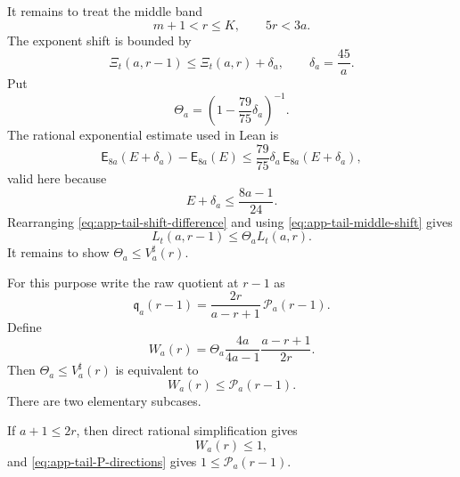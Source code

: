 \documentclass[11pt]{article}
\theoremstyle{definition}
\theoremstyle{remark}
\newcommand{\PE}{\mathsf E}
\begin{document}
It remains to treat the middle band
\begin{equation}\label{eq:app-tail-middle-upper}
 m+1<r\le K,
 \qquad 5r<3a.
\end{equation}
The exponent shift is bounded by
\begin{equation}\label{eq:app-tail-middle-shift}
 \Xi_t(a,r-1)\le \Xi_t(a,r)+\delta_a,
 \qquad \delta_a=\frac{45}{a}.
\end{equation}
Put
\begin{equation}\label{eq:app-tail-F}
 \Theta_a=\left(1-\frac{79}{75}\delta_a\right)^{-1}.
\end{equation}
The rational exponential estimate used in Lean is
\begin{equation}\label{eq:app-tail-shift-difference}
 \PE_{8a}(E+\delta_a)-\PE_{8a}(E)
 \le \frac{79}{75}\delta_a\,\PE_{8a}(E+\delta_a),
\end{equation}
valid here because
\begin{equation}\label{eq:app-tail-shift-cutoff}
 E+\delta_a\le\frac{8a-1}{24}.
\end{equation}
Rearranging \eqref{eq:app-tail-shift-difference} and using
\eqref{eq:app-tail-middle-shift} gives
\begin{equation}\label{eq:app-tail-middle-shell}
 L_t(a,r-1)\le \Theta_aL_t(a,r).
\end{equation}
It remains to show $\Theta_a\le V^{\sharp}_a(r)$.

For this purpose write the raw quotient at $r-1$ as
\begin{equation}\label{eq:app-tail-reverse-factor}
 \mathfrak q_a(r-1)=
 \frac{2r}{a-r+1}\,\mathcal P_a(r-1).
\end{equation}
Define
\begin{equation}\label{eq:app-tail-W}
 W_a(r)=\Theta_a\frac{4a}{4a-1}\frac{a-r+1}{2r}.
\end{equation}
Then $\Theta_a\le V^{\sharp}_a(r)$ is equivalent to
\begin{equation}\label{eq:app-tail-W-target}
 W_a(r)\le\mathcal P_a(r-1).
\end{equation}
There are two elementary subcases.

If $a+1\le2r$, then direct rational simplification gives
\begin{equation}\label{eq:app-tail-W-midpoint}
 W_a(r)\le1,
\end{equation}
and \eqref{eq:app-tail-P-directions} gives
$1\le\mathcal P_a(r-1)$.
\end{document}
